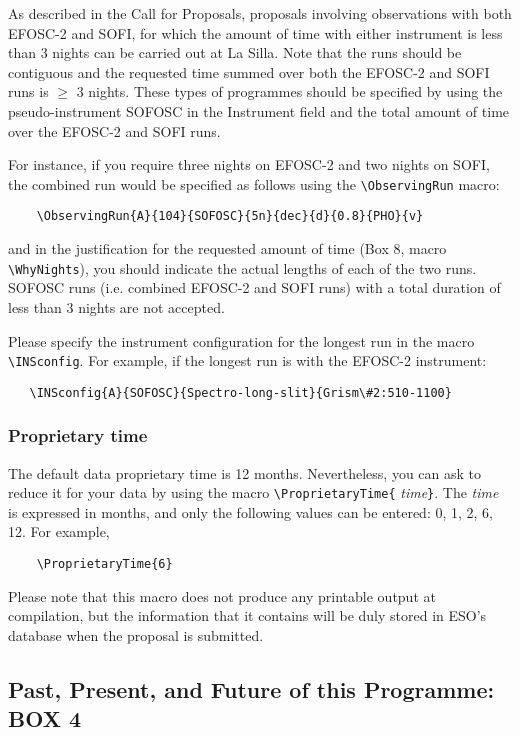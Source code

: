 \documentclass{article}
\begin{document}
As described in the Call for Proposals,
proposals involving observations with both EFOSC-2 and SOFI,
for which the amount of time with either instrument is less than
3 nights can be carried out at La Silla.
Note that the runs should be contiguous and the requested time
summed over both the EFOSC-2 and SOFI runs is $\ge$ 3 nights.
These types of programmes should be specified
by using the pseudo-instrument SOFOSC in the Instrument field and
the total amount of time over the EFOSC-2 and SOFI runs.

For instance, if you require three nights on EFOSC-2 and two nights on SOFI, the
combined run would be specified as follows using the \verb|\ObservingRun| macro:
\begin{verbatim}
    \ObservingRun{A}{104}{SOFOSC}{5n}{dec}{d}{0.8}{PHO}{v}
\end{verbatim}

and in the justification for the requested amount of time
(Box 8, macro \verb|\WhyNights|), you should indicate the actual
lengths of each of the two runs. 
SOFOSC runs (i.e. combined EFOSC-2 and SOFI runs)  with a
total duration of less than 3 nights are not accepted.

Please specify the instrument configuration for the longest run
in the macro \verb|\INSconfig|. For example, if the longest run
is with the EFOSC-2 instrument:
\begin{verbatim}
   \INSconfig{A}{SOFOSC}{Spectro-long-slit}{Grism\#2:510-1100}
\end{verbatim}

\subsubsection*{Proprietary time} 
The default data proprietary time is 12 months.  Nevertheless, you can
ask to reduce it for 
your data by using the macro \verb|\ProprietaryTime{|{\it
    time\/}\verb|}|.  The {\it time\/} is expressed in months, and
only the following values can be entered:  0, 1, 2, 6, 12.  For
example, 
\begin{verbatim}
    \ProprietaryTime{6}
\end{verbatim}

Please note that this macro does not produce any printable output at
compilation, but the information that it contains will be duly stored
in ESO's database when the proposal is submitted.

\subsection{Past, Present, and Future of this Programme:  {\bf BOX 4}}
\end{document}

